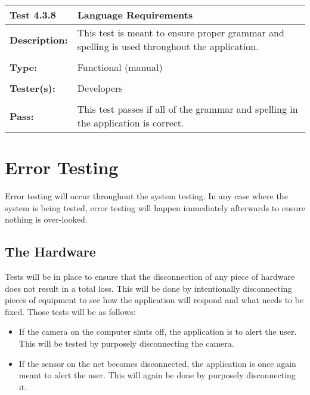 \documentclass{article}
\begin{document}
\begin{tabularx}{\textwidth}{p{2cm}p{9cm}}
\toprule 
{\bf Test 4.3.8} & {\bf Language Requirements}\\
\midrule
\textbf{Description:} &  This test is meant to ensure proper grammar and spelling is used throughout the application.\\[0.3\baselineskip]
                      &                     \\
\textbf{Type:} & Functional (manual)   \\[0.3\baselineskip]
                      &                     \\
\textbf{Tester(s):} & Developers \\[0.3\baselineskip]
                      &                     \\
\textbf{Pass:} & This test passes if all of the grammar and spelling in the application is correct. \\[0.3\baselineskip]
\bottomrule
\end{tabularx}
\newpage

\section{Error Testing}
Error testing will occur throughout the system testing. In any case where the system is being tested, error testing will happen immediately afterwards to ensure nothing is over-looked.

\subsection{The Hardware}
Tests will be in place to ensure that the disconnection of any piece of hardware does not result in a total loss. This will be done by intentionally disconnecting pieces of equipment to see how the application will respond and what needs to be fixed. Those tests will be as follows:
\begin{itemize}
    \item If the camera on the computer shuts off, the application is to alert the user. This will be tested by purposely disconnecting the camera.
    \item If the sensor on the net becomes disconnected, the application is once again meant to alert the user. This will again be done by purposely disconnecting it.
\end{itemize}
\end{document}
